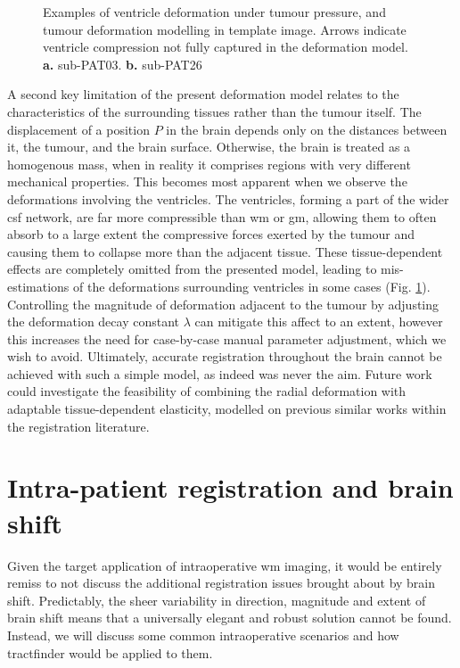 \documentclass[12pt,phd,a4paper,twoside]{ucl_thesis}
\begin{document}
\begin{figure}[htb!]
  
  \caption[Ventricle deformation examples]{Examples of ventricle deformation under tumour pressure, and tumour deformation modelling in template image. Arrows indicate ventricle compression not fully captured in the deformation model. \textbf{\sffamily a.}  sub-PAT03. \textbf{\sffamily b.}  sub-PAT26}
  \label{fig:ventricles}
\end{figure}

A second key limitation of the present deformation model relates to the characteristics of the surrounding tissues rather than the tumour itself.
The displacement of a position $P$ in the brain depends only on the distances between it, the tumour, and the brain surface.
Otherwise, the brain is treated as a homogenous mass, when in reality it comprises regions with very different mechanical properties.
This becomes most apparent when we observe the deformations involving the ventricles.
The ventricles, forming a part of the wider \gls{csf} network, are far more compressible than \gls{wm} or \gls{gm}, allowing them to often absorb to a large extent the compressive forces exerted by the tumour and causing them to collapse more than the adjacent tissue.
These tissue-dependent effects are completely omitted from the presented model, leading to mis-estimations of the deformations surrounding ventricles in some cases (Fig. \ref{fig:ventricles}).
Controlling the magnitude of deformation adjacent to the tumour by adjusting the deformation decay constant $\lambda$ can mitigate this affect to an extent, however this increases the need for case-by-case manual parameter adjustment, which we wish to avoid.
Ultimately, accurate registration throughout the brain cannot be achieved with such a simple model, as indeed was never the aim.
Future work could investigate the feasibility of combining the radial deformation with adaptable tissue-dependent elasticity, modelled on previous similar works within the registration literature\autocite{Rohde2003,Duay2004}.
\clearpage{}
\clearpage{}\section{Intra-patient registration and brain shift}

Given the target application of intraoperative \gls{wm} imaging, it would be entirely remiss to not discuss the additional registration issues brought about by brain shift.
Predictably, the sheer variability in direction, magnitude and extent of brain shift means that a universally elegant and robust solution cannot be found.
Instead, we will discuss some common intraoperative scenarios and how tractfinder would be applied to them.
\end{document}
